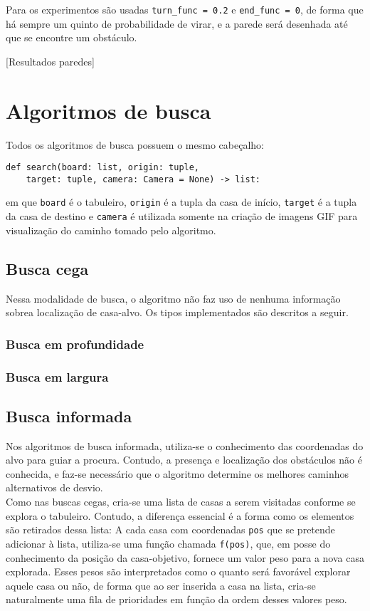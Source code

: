 \documentclass{article}
\begin{document}
Para os experimentos são usadas \verb|turn_func = 0.2| e \verb|end_func = 0|, de forma que há sempre um quinto de probabilidade de virar, e a parede será desenhada até que se encontre um obstáculo.

[Resultados paredes]

\section{Algoritmos de busca}
Todos os algoritmos de busca possuem o mesmo cabeçalho:

\begin{lstlisting}
def search(board: list, origin: tuple,
	target: tuple, camera: Camera = None) -> list:
\end{lstlisting}

em que \verb|board| é o tabuleiro, \verb|origin| é a tupla da casa de início, \verb|target| é a tupla da casa de destino e \verb|camera| é utilizada somente na criação de imagens GIF para visualização do caminho tomado pelo algoritmo.

\subsection{Busca cega}
Nessa modalidade de busca, o algoritmo não faz uso de nenhuma informação sobrea localização de casa-alvo. Os tipos implementados são descritos a seguir.
\subsubsection{Busca em profundidade}
\subsubsection{Busca em largura}

\subsection{Busca informada}
Nos algoritmos de busca informada, utiliza-se o conhecimento das coordenadas do alvo para guiar a procura. Contudo, a presença e localização dos obstáculos não é conhecida, e faz-se necessário que o algoritmo determine os melhores caminhos alternativos de desvio.\\

Como nas buscas cegas, cria-se uma lista de casas a serem visitadas conforme se explora o tabuleiro. Contudo, a diferença essencial é a forma como os elementos são retirados dessa lista: A cada casa com coordenadas \verb|pos| que se pretende adicionar à lista, utiliza-se uma função chamada \verb|f(pos)|, que, em posse do conhecimento da posição da casa-objetivo, fornece um valor peso para a nova casa explorada. Esses pesos são interpretados como o quanto será favorável explorar aquele casa ou não, de forma que ao ser inserida a casa na lista, cria-se naturalmente uma fila de prioridades em função da ordem desses valores peso.\\
\end{document}
